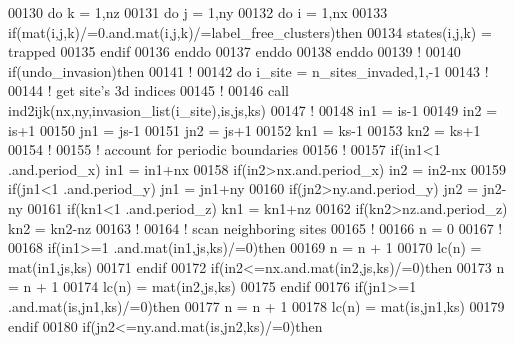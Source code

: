 \begin{DoxyCode}
00130     \textcolor{keyword}{do} k = 1,nz
00131        \textcolor{keyword}{do} j = 1,ny
00132           \textcolor{keyword}{do} i = 1,nx
00133              \textcolor{keyword}{if}(mat(i,j,k)/=0.and.mat(i,j,k)/=label\_free\_clusters)\textcolor{keyword}{then}
00134                 states(i,j,k) = trapped
00135              \textcolor{keyword}{endif}
00136           \textcolor{keyword}{enddo}
00137        \textcolor{keyword}{enddo}
00138     \textcolor{keyword}{enddo}
00139     \textcolor{comment}{!}
00140     \textcolor{keyword}{if}(undo\_invasion)\textcolor{keyword}{then}
00141        \textcolor{comment}{!}
00142        \textcolor{keyword}{do} i\_site = n\_sites\_invaded,1,-1
00143           \textcolor{comment}{!}
00144           \textcolor{comment}{! get site's 3d indices}
00145           \textcolor{comment}{!}
00146           call ind2ijk(nx,ny,invasion\_list(i\_site),is,js,ks)
00147           \textcolor{comment}{!   }
00148           in1 = is-1
00149           in2 = is+1
00150           jn1 = js-1
00151           jn2 = js+1
00152           kn1 = ks-1
00153           kn2 = ks+1
00154           \textcolor{comment}{!}
00155           \textcolor{comment}{! account for periodic boundaries}
00156           \textcolor{comment}{!}
00157           \textcolor{keyword}{if}(in1<1 .and.period\_x) in1 = in1+nx
00158           \textcolor{keyword}{if}(in2>nx.and.period\_x) in2 = in2-nx
00159           \textcolor{keyword}{if}(jn1<1 .and.period\_y) jn1 = jn1+ny
00160           \textcolor{keyword}{if}(jn2>ny.and.period\_y) jn2 = jn2-ny
00161           \textcolor{keyword}{if}(kn1<1 .and.period\_z) kn1 = kn1+nz
00162           \textcolor{keyword}{if}(kn2>nz.and.period\_z) kn2 = kn2-nz
00163           \textcolor{comment}{!}
00164           \textcolor{comment}{!  scan neighboring sites}
00165           \textcolor{comment}{!}
00166           n = 0
00167           \textcolor{comment}{!}
00168           \textcolor{keyword}{if}(in1>=1 .and.mat(in1,js,ks)/=0)\textcolor{keyword}{then} 
00169              n = n + 1
00170              lc(n) = mat(in1,js,ks) 
00171           \textcolor{keyword}{endif}
00172           \textcolor{keyword}{if}(in2<=nx.and.mat(in2,js,ks)/=0)\textcolor{keyword}{then}
00173              n = n + 1
00174              lc(n) = mat(in2,js,ks)
00175           \textcolor{keyword}{endif}
00176           \textcolor{keyword}{if}(jn1>=1 .and.mat(is,jn1,ks)/=0)\textcolor{keyword}{then}
00177              n = n + 1
00178              lc(n) = mat(is,jn1,ks) 
00179           \textcolor{keyword}{endif}
00180           \textcolor{keyword}{if}(jn2<=ny.and.mat(is,jn2,ks)/=0)\textcolor{keyword}{then} 

\end{DoxyCode}
